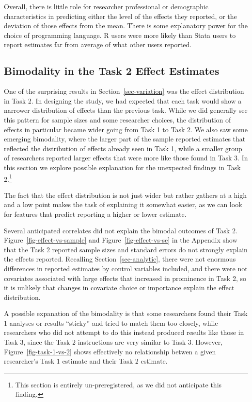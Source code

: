 \documentclass[
  letterpaper,
  DIV=11,
  numbers=noendperiod]{scrartcl}
\begin{document}
Overall, there is little role for researcher professional or demographic
characteristics in predicting either the level of the effects they
reported, or the deviation of those effects from the mean. There is some
explanatory power for the choice of programming language. R users were
more likely than Stata users to report estimates far from average of
what other users reported.

\hypertarget{sec-bimodal}{%
\subsection{Bimodality in the Task 2 Effect
Estimates}\label{sec-bimodal}}

One of the surprising results in Section~\ref{sec-variation} was the
effect distribution in Task 2. In designing the study, we had expected
that each task would show a narrower distribution of effects than the
previous task. While we did generally see this pattern for sample sizes
and some researcher choices, the distribution of effects in particular
became wider going from Task 1 to Task 2. We also saw some emerging
bimodality, where the larger part of the sample reported estimates that
reflected the distribution of effects already seen in Task 1, while a
smaller group of researchers reported larger effects that were more like
those found in Task 3. In this section we explore possible explanation
for the unexpected findings in Task 2.\footnote{This section is entirely
  un-preregistered, as we did not anticipate this finding.}

The fact that the effect distribution is not just wider but rather
gathers at a high and a low point makes the task of explaining it
somewhat easier, as we can look for features that predict reporting a
higher or lower estimate.

Several anticipated correlates did not explain the bimodal outcomes of
Task 2. Figure~\ref{fig-effect-vs-sample} and
Figure~\ref{fig-effect-vs-se} in the Appendix show that the Task 2
reported sample sizes and standard errors do not strongly explain the
effects reported. Recalling Section~\ref{sec-analytic}, there were not
enormous differences in reported estimates by control variables
included, and there were not covariates associated with large effects
that increased in prominence in Task 2, so it is unlikely that changes
in covariate choice or importance explain the effect distribution.

A possible expanation of the bimodality is that some researchers found
their Task 1 analyses or results ``sticky'' and tried to match them too
closely, while researchers who did not attempt to do this instead
produced results like those in Task 3, since the Task 2 instructions are
very similar to Task 3. However, Figure~\ref{fig-task-1-vs-2} shows
effectively no relationship betwen a given researcher's Task 1 estimate
and their Task 2 estimate.
\end{document}
